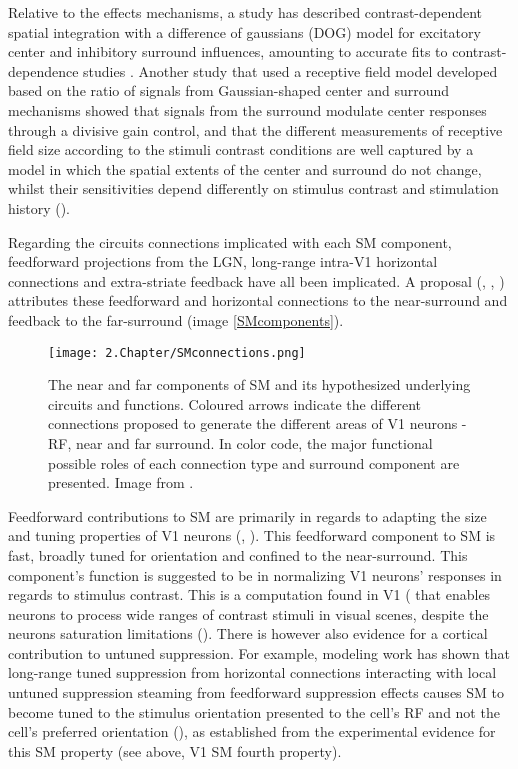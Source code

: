 Relative to the effects mechanisms, a study has described contrast-dependent spatial integration with a difference of gaussians (DOG) model for excitatory center and inhibitory surround influences, amounting to accurate fits to contrast-dependence studies \cite{Sceniak1999}. Another study that used a receptive field model developed based on the ratio of signals from Gaussian-shaped center and surround mechanisms showed that signals from the surround modulate center responses through a divisive gain control, and that the different measurements of receptive field size according to the stimuli contrast conditions are well captured by a model in which the spatial extents of the center and surround do not change, whilst their sensitivities depend differently on stimulus contrast and stimulation history (\cite{Cavanaugh2002a}). 

Regarding the circuits connections implicated with each SM component, feedforward projections from the LGN, long-range intra-V1 horizontal connections and extra-striate feedback have all been implicated. A proposal (\cite{Angelucci2002}, \cite{Angelucci2006}, \cite{Nurminem2014}) attributes these feedforward and horizontal connections to the near-surround and feedback to the far-surround (image \ref{SMcomponents}).

\begin{figure}[H]
\center
\texttt{[image: 2.Chapter/SMconnections.png]}
\caption{The near and far components of SM and its hypothesized underlying circuits and functions. Coloured arrows indicate the different connections proposed to generate the different areas of V1 neurons - RF, near and far surround. In color code, the major functional possible roles of each connection type and surround component are presented.
\newline \newline \tiny{Image from \cite{Shushruth2013}.}}
\label{SMconnections}
\end{figure}

Feedforward contributions to SM are primarily in regards to adapting the size and tuning properties of V1 neurons (\cite{Hubel1962}, \cite{Angelucci2006}). This feedforward component to SM is fast, broadly tuned for orientation and confined to the near-surround. This component's function is suggested to be in normalizing V1 neurons' responses in regards to stimulus contrast. This is a computation found in V1 (\cite{Heeger1992} that enables neurons to process wide ranges of contrast stimuli in visual scenes, despite the neurons saturation limitations (\cite{Carandini2012}). There is however also evidence for a cortical contribution to untuned suppression. For example, modeling work has shown that long-range tuned suppression from horizontal connections interacting with local untuned suppression steaming from feedforward suppression effects causes SM to become tuned to the stimulus orientation presented to the cell's RF and not the cell's preferred orientation (\cite{Shushruth2012}), as established from the experimental evidence for this SM property (see above, V1 SM fourth property).

